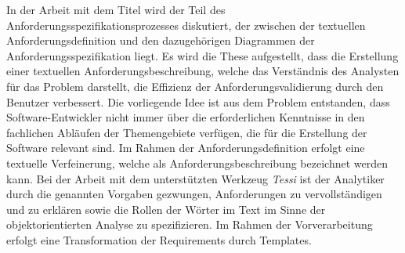 In der Arbeit mit dem Titel \cite{kroha2000preprocessing} wird der Teil des Anforderungsspezifikationsprozesses diskutiert, der zwischen der textuellen Anforderungsdefinition und den dazugehörigen Diagrammen der Anforderungsspezifikation liegt. Es wird die These aufgestellt, dass die Erstellung einer textuellen Anforderungsbeschreibung, welche das Verständnis des Analysten für das Problem darstellt, die Effizienz der Anforderungsvalidierung durch den Benutzer verbessert. Die vorliegende Idee ist aus dem Problem entstanden, dass Software-Entwickler nicht immer über die erforderlichen Kenntnisse in den fachlichen Abläufen der Themengebiete verfügen, die für die Erstellung der Software relevant sind. Im Rahmen der Anforderungsdefinition erfolgt eine textuelle Verfeinerung, welche als Anforderungsbeschreibung bezeichnet werden kann. Bei der Arbeit mit dem unterstützten Werkzeug \emph{Tessi} ist der Analytiker durch die genannten Vorgaben gezwungen, Anforderungen zu vervollständigen und zu erklären sowie die Rollen der Wörter im Text im Sinne der objektorientierten Analyse zu spezifizieren. Im Rahmen der Vorverarbeitung erfolgt eine Transformation der Requirements durch Templates.

